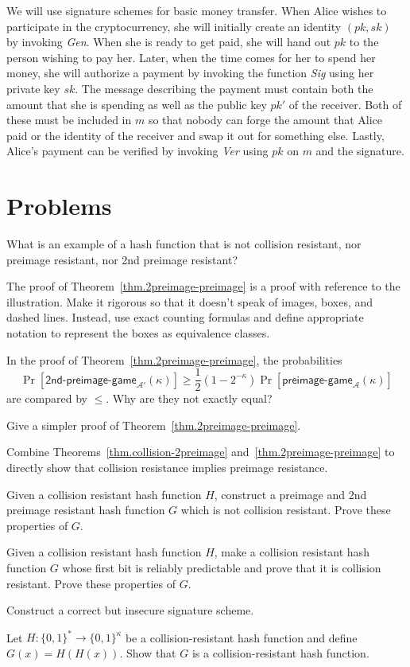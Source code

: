 We will use signature schemes for basic money transfer. When Alice wishes to participate
in the cryptocurrency, she will initially create an identity $(pk, sk)$ by invoking
\emph{Gen}. When she is ready to get paid, she will hand out $pk$ to the person wishing to
pay her. Later, when the time comes for her to spend her money, she will authorize a payment
by invoking the function \emph{Sig} using her private key $sk$. The message describing
the payment must contain both the amount that she is spending as well as the public key
$pk'$ of the receiver. Both of these must be included in $m$ so that nobody can forge
the amount that Alice paid or the identity of the receiver and swap it out for something
else. Lastly, Alice's payment can be verified by invoking \emph{Ver} using $pk$ on $m$ and the signature.

\section*{Problems}

\begin{problems}
  \item What is an example of a hash function that is not collision resistant, nor preimage resistant, nor
        2nd preimage resistant?
  \item The proof of Theorem~\ref{thm.2preimage-preimage} is a proof with reference to the illustration. Make it rigorous so that it doesn't speak of images, boxes, and dashed lines. Instead, use exact counting formulas and define appropriate notation to represent the boxes as equivalence classes.
  \item In the proof of Theorem~\ref{thm.2preimage-preimage}, the probabilities
    \[
      \Pr[\textsf{2nd-preimage-game}_{\mathcal{A}'}(\kappa)] \geq \frac{1}{2} (1 - 2^{-\kappa}) \Pr[\textsf{preimage-game}_\mathcal{A}(\kappa)]
    \]
    are compared by $\leq$. Why are they not exactly equal?
  \item Give a simpler proof of Theorem~\ref{thm.2preimage-preimage}.
  \item Combine Theorems~\ref{thm.collision-2preimage} and~\ref{thm.2preimage-preimage} to
        directly show that collision resistance implies preimage resistance.
  \item Given a collision resistant hash function $H$, construct a preimage and 2nd preimage resistant hash
        function $G$ which is not collision resistant. Prove these properties of $G$.
  \item Given a collision resistant hash function $H$,
        make a collision resistant hash function $G$ whose first bit is reliably predictable
        and prove that it is collision resistant. Prove these properties of $G$.\label{problem:small-hash}
  \item Construct a correct but insecure signature scheme.
  \item Let $H:\{0,1\}^* \to \{0,1\}^{\kappa}$ be a collision-resistant hash function and define
        $G(x) = H(H(x))$. Show that $G$ is a collision-resistant hash function.
\end{problems}


